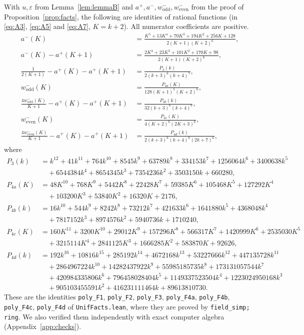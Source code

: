 \documentclass[11pt]{amsart}
\theoremstyle{definition}
\theoremstyle{remark}
\numberwithin{equation}{section}
\newcommand{\aup}{a^{+}}
\newcommand{\alo}{a^{-}}
\newcommand{\lean}[1]{\texttt{#1}}
\begin{document}
With $u,\varepsilon$ from Lemma~\ref{lem:lemmaB} and $\aup,\alo,w^-_{\mathrm{odd}},w^-_{\mathrm{even}}$
from the proof of Proposition~\ref{prop:facts}, the following are identities of rational functions (in
\eqref{eq:A3}, \eqref{eq:A5} and \eqref{eq:A7}, $K=k+2$). All numerator coefficients are positive.
\begin{align}
  \alo(K)&=\frac{K^5+13K^4+70K^3+194K^2+256K+128}{2(K+1)(K+2)^6},\label{eq:A1}\\
  \alo(K)-\aup(K+1)&=\frac{2K^4+23K^3+101K^2+170K+98}{2(K+1)(K+2)^6},\label{eq:A2}\\
  \frac1{2(K+1)}-\aup(K)-\aup(K+1)&=\frac{P_3(k)}{2(k+3)^6(k+4)^7},\label{eq:A3}\\
  w^-_{\mathrm{odd}}(K)&=\frac{P_{4a}(K)}{128(K+1)^5(K+2)^6},\label{eq:A4}\\
  \frac{4w^-_{\mathrm{odd}}(K)}{K+1}-\aup(K)-\aup(K+1)&=\frac{P_{4b}(k)}{32(k+3)^6(k+4)^6},\label{eq:A5}\\
  w^-_{\mathrm{even}}(K)&=\frac{P_{4c}(K)}{4(K+2)^6(2K+3)^6},\label{eq:A6}\\
  \frac{4w^-_{\mathrm{even}}(K)}{K+1}-\aup(K)-\aup(K+1)&=\frac{P_{4d}(k)}{2(k+3)^6(k+4)^6(2k+7)^6},\label{eq:A7}
\end{align}
where
\begin{align*}
P_3(k)&=k^{12}+41k^{11}+764k^{10}+8545k^9+63789k^8+334153k^7+1256064k^6+3400638k^5\\
&\quad+6544384k^4+8654345k^3+7354236k^2+3503150k+660280,\\
P_{4a}(K)&=48K^{10}+768K^9+5442K^8+22428K^7+59385K^6+105468K^5+127292K^4\\
&\quad+103200K^3+53840K^2+16320K+2176,\\
P_{4b}(k)&=16k^{10}+544k^9+8242k^8+73212k^7+421633k^6+1641880k^5+4368048k^4\\
&\quad+7817152k^3+8974576k^2+5940736k+1710240,\\
P_{4c}(K)&=160K^{11}+3200K^{10}+29012K^9+157296K^8+566317K^7+1420999K^6+2535030K^5\\
&\quad+3215114K^4+2841125K^3+1666285K^2+583870K+92626,\\
P_{4d}(k)&=192k^{16}+10816k^{15}+285192k^{14}+4672168k^{13}+53227666k^{12}+447135728k^{11}\\
&\quad+2864967224k^{10}+14282437922k^9+55985185735k^8+173131057544k^7\\
&\quad+420984335806k^6+796458028404k^5+1149337523504k^4+1223024950168k^3\\
&\quad+905103455591k^2+416231111464k+89613810730.
\end{align*}
These are the identities \lean{poly\_F1}, \lean{poly\_F2}, \lean{poly\_F3}, \lean{poly\_F4a},
\lean{poly\_F4b}, \lean{poly\_F4c}, \lean{poly\_F4d} of \lean{UnifFacts.lean}, where they are proved by
\lean{field\_simp; ring}. We also verified them independently with exact computer algebra
(Appendix~\ref{app:checks}).
\end{document}
